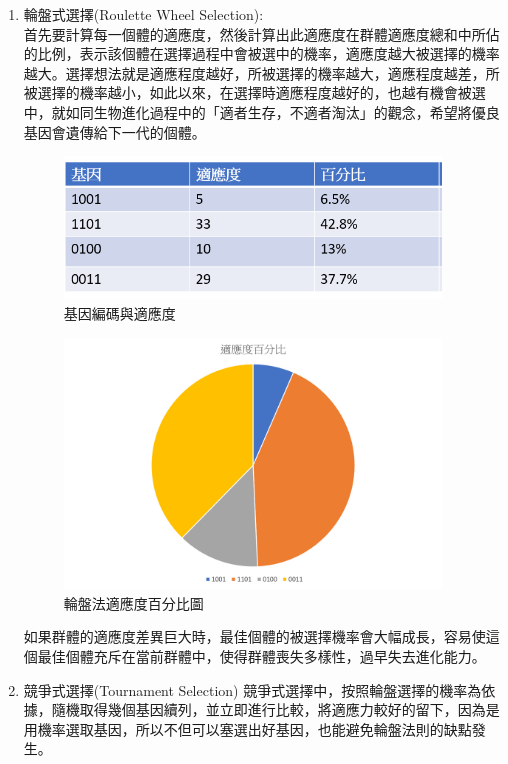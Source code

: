          \begin{enumerate}
        \item 
       輪盤式選擇(Roulette Wheel Selection):\\
       首先要計算每一個體的適應度，然後計算出此適應度在群體適應度總和中所佔的比例，表示該個體在選擇過程中會被選中的機率，適應度越大被選擇的機率越大。選擇想法就是適應程度越好，所被選擇的機率越大，適應程度越差，所被選擇的機率越小，如此以來，在選擇時適應程度越好的，也越有機會被選中，就如同生物進化過程中的「適者生存，不適者淘汰」的觀念，希望將優良基因會遺傳給下一代的個體。
                \begin{figure}[H]
            \centerline{\includegraphics[width=10cm]{pic/Wheel.PNG}}
            \caption{基因編碼與適應度}
            \label{fig:wheel}
        \end{figure}
                 \begin{figure}[H]
            \centerline{\includegraphics[width=10cm]{pic/wheelFitness.png}}
            \caption{輪盤法適應度百分比圖}
            \label{fig:wheelf}
        \end{figure}
        如果群體的適應度差異巨大時，最佳個體的被選擇機率會大幅成長，容易使這個最佳個體充斥在當前群體中，使得群體喪失多樣性，過早失去進化能力。
       
       \item  
       競爭式選擇(Tournament Selection) 
        競爭式選擇中，按照輪盤選擇的機率為依據，隨機取得幾個基因續列，並立即進行比較，將適應力較好的留下，因為是用機率選取基因，所以不但可以塞選出好基因，也能避免輪盤法則的缺點發生。
        \end{enumerate}

